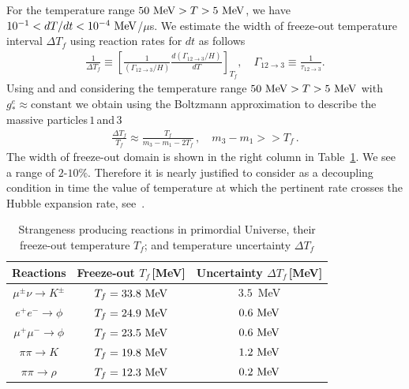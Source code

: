 For the temperature range $50\text{ MeV}>T>5\text{ MeV}$, we have $10^{-1}<dT/dt<10^{-4}\text{ MeV}$/$\mu$s. We estimate the  width of freeze-out temperature interval $\Delta T_f$ using reaction rates for $dt$ as follows
\begin{align}
\frac{1}{\Delta T_f}\equiv \left[\frac{1}{(\Gamma_{12\to3}/H)}\frac{d(\Gamma_{12\to3}/H)}{dT}\right]_{T_f},\quad \Gamma_{12\to3}\equiv\frac{1}{\tau_{12\to3}}.
\end{align}
Using  and  and considering the temperature range $50\text{ MeV}>T>5\text{ MeV}$ with $g^e_\ast\approx\mathrm{constant}$ we obtain using the Boltzmann approximation to describe the massive particles\,$1$\,and\,$3$
\begin{align}\label{DeltaFreezeout}
 \frac{\Delta T_f}{ T_f} \approx\frac{T_f }{ m_3 - m_1 -2T_f}\,,\quad m_3 - m_1>> T_f\,.
\end{align}
The width of freeze-out domain is shown in the right column in Table~\ref{FreezeoutTemperature_table}. We see a range of $2$-$10\%$. Therefore it is nearly justified to consider as a decoupling condition in time the value of temperature at which the pertinent rate crosses the Hubble expansion rate, see~.
 
\begin{table} 
\centering
\begin{tabular}{c| c| c}
\hline\hline
Reactions &Freeze-out $T_f$\,[MeV] & {Uncertainty $\Delta T_f$\,[MeV]} \\
\hline
$\mu^\pm\nu\rightarrow K^\pm$ & $T_f=33.8\text{ MeV}$ & {$3.5$ \,MeV}\\ 
\hline
$e^+e^-\rightarrow \phi$ & $T_f=24.9\text{ MeV}$ &{$0.6\text{ MeV}$}\\
$\mu^+\mu^-\rightarrow\phi$ & $T_f=23.5\text{ MeV}$ &{$0.6\text{ MeV}$}\\
\hline
 $\pi\pi\rightarrow K$ & $T_f=19.8\text{ MeV}$&{$1.2\text{ MeV}$}\\
\hline
$\pi\pi\rightarrow\rho$ & $T_f=12.3\text{ MeV}$&{$0.2\text{ MeV}$}\\
\hline\hline
\end{tabular}
\caption{Strangeness producing reactions in primordial Universe, their freeze-out temperature $T_f$; and temperature uncertainty $\Delta T_f$}
\label{FreezeoutTemperature_table} 
\end{table}

